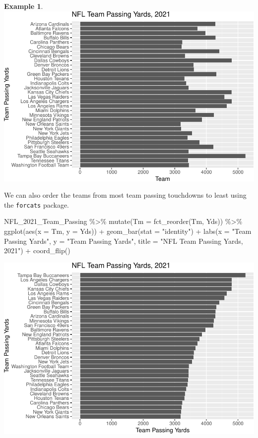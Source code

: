 \documentclass[
  11pt,
]{book}
\newenvironment{Shaded}{\begin{snugshade}}{\end{snugshade}}
\newcommand{\AttributeTok}[1]{\textcolor[rgb]{0.77,0.63,0.00}{#1}}
\newcommand{\FunctionTok}[1]{\textcolor[rgb]{0.00,0.00,0.00}{#1}}
\newcommand{\NormalTok}[1]{#1}
\newcommand{\SpecialCharTok}[1]{\textcolor[rgb]{0.00,0.00,0.00}{#1}}
\newcommand{\StringTok}[1]{\textcolor[rgb]{0.31,0.60,0.02}{#1}}
\theoremstyle{definition}
\theoremstyle{definition}
\newtheorem{example}{Example}[chapter]
\theoremstyle{definition}
\theoremstyle{definition}
\theoremstyle{remark}
\begin{document}
\begin{example}
\includegraphics{series_files/figure-latex/bar3-1.pdf}
\end{example}

\vfill
\newpage

We can also order the teams from most team passing touchdowns to least using the \texttt{forcats} package.

\begin{Shaded}
\begin{Highlighting}[]
\NormalTok{NFL\_2021\_Team\_Passing }\SpecialCharTok{\%\textgreater{}\%}
    \FunctionTok{mutate}\NormalTok{(}\AttributeTok{Tm =} \FunctionTok{fct\_reorder}\NormalTok{(Tm, Yds)) }\SpecialCharTok{\%\textgreater{}\%}
    \FunctionTok{ggplot}\NormalTok{(}\FunctionTok{aes}\NormalTok{(}\AttributeTok{x =}\NormalTok{ Tm, }\AttributeTok{y =}\NormalTok{ Yds)) }\SpecialCharTok{+} \FunctionTok{geom\_bar}\NormalTok{(}\AttributeTok{stat =} \StringTok{"identity"}\NormalTok{) }\SpecialCharTok{+} \FunctionTok{labs}\NormalTok{(}\AttributeTok{x =} \StringTok{"Team Passing Yards"}\NormalTok{,}
    \AttributeTok{y =} \StringTok{"Team Passing Yards"}\NormalTok{, }\AttributeTok{title =} \StringTok{"NFL Team Passing Yards, 2021"}\NormalTok{) }\SpecialCharTok{+} \FunctionTok{coord\_flip}\NormalTok{()}
\end{Highlighting}
\end{Shaded}

\includegraphics{series_files/figure-latex/unnamed-chunk-9-1.pdf}
\end{document}
